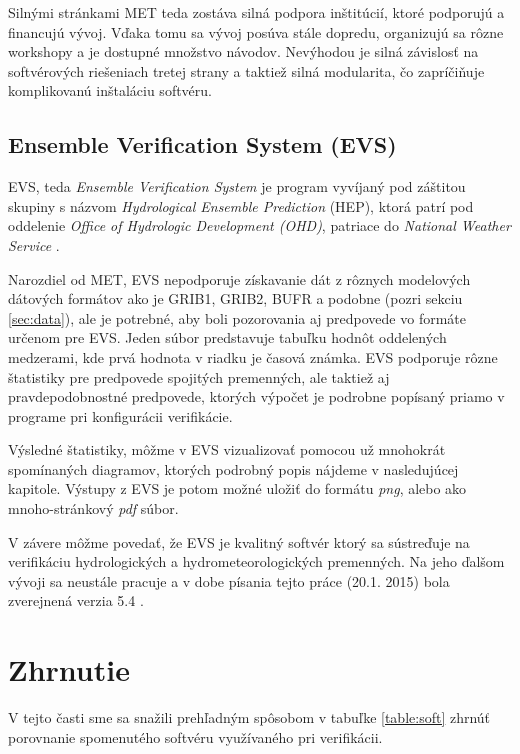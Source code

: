 Silnými stránkami MET teda zostáva silná podpora inštitúcií, ktoré podporujú a financujú vývoj. Vďaka tomu sa vývoj posúva stále dopredu, organizujú sa rôzne workshopy a je dostupné množstvo návodov. Nevýhodou je silná závislosť na softvérových riešeniach tretej strany a taktiež silná modularita, čo zapríčiňuje komplikovanú inštaláciu softvéru.

\subsection[EVS]{Ensemble Verification System (EVS)}
EVS, teda \textit{Ensemble Verification System} \cite{EVS} je program vyvíjaný pod záštitou skupiny s názvom \textit{Hydrological Ensemble Prediction} (HEP), ktorá patrí pod oddelenie \textit{Office of Hydrologic Development (OHD)}, patriace do \textit{National Weather Service} \cite{EVSmanual}.

Narozdiel od MET, EVS nepodporuje získavanie dát z rôznych modelových dátových formátov ako je GRIB1, GRIB2, BUFR a podobne (pozri sekciu \ref{sec:data}), ale je potrebné, aby boli pozorovania aj predpovede vo formáte určenom pre EVS. Jeden súbor predstavuje tabuľku hodnôt oddelených medzerami, kde prvá hodnota v riadku je časová známka. EVS podporuje rôzne štatistiky pre predpovede spojitých premenných, ale taktiež aj pravdepodobnostné predpovede, ktorých výpočet je podrobne popísaný priamo v programe pri konfigurácii verifikácie.

Výsledné štatistiky, môžme v EVS vizualizovať pomocou už mnohokrát spomínaných diagramov, ktorých podrobný popis nájdeme v nasledujúcej kapitole. Výstupy z EVS je potom možné uložiť do formátu \textit{png}, alebo ako mnoho-stránkový \textit{pdf} súbor.

V závere môžme povedať, že EVS je kvalitný softvér ktorý sa sústreďuje na verifikáciu hydrologických a hydrometeorologických premenných. Na jeho ďalšom vývoji sa neustále pracuje a v dobe písania tejto práce (20.1. 2015) bola zverejnená verzia 5.4 \cite{EVS}.



\section{Zhrnutie}
V tejto časti sme sa snažili prehľadným spôsobom v tabuľke \ref{table:soft} zhrnúť porovnanie spomenutého softvéru využívaného pri verifikácii.


